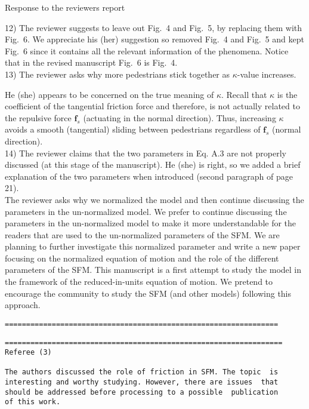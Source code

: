 \documentclass[a4paper,12pt]{letter}
\begin{document}
\begin{letter}{Response to the reviewers report}
{12) The reviewer suggests to leave out Fig.~4 and Fig.~5, by replacing them with Fig.~6. 
We appreciate his (her) suggestion so removed Fig.~4 and Fig.~5 and kept Fig.~6 since it
contains all the relevant information of the phenomena. Notice that in the revised manuscript Fig.~6 is Fig.~4. \\

13) The reviewer asks why more pedestrians stick together as $\kappa$-value increases. 

He (she) appears to be concerned on the true meaning of $\kappa$. 
Recall that $\kappa$ is the coefficient of the tangential friction force and therefore,
is not actually related to the repulsive force $\mathbf{f}_s$ (actuating in the normal direction). 
Thus, increasing $\kappa$ avoids a smooth (tangential) sliding between pedestrians
regardless of $\mathbf{f}_s$ (normal direction). \\

14) The reviewer claims that the two parameters in Eq. A.3 are not properly discussed (at this stage of the manuscript).
He (she) is right, so we added a brief explanation of the two parameters when introduced (second paragraph of page 21).\\

The reviewer asks why we normalized the model and then continue discussing the parameters in the un-normalized model. We prefer to continue discussing the parameters in the un-normalized model to make it more understandable for the readers that are used to the un-normalized parameters of the SFM. We are planning to further investigate this normalized parameter and write a new paper focusing on the normalized equation of motion and the role of the different parameters of the SFM. This manuscript is a first attempt to study the model in the framework of the reduced-in-units equation of motion. We pretend to encourage the community to study the SFM (and other models) following this approach.


\begin{verbatim}
================================================================
\end{verbatim}

}

\newpage


\begin{verbatim}
=================================================================
Referee (3)

The authors discussed the role of friction in SFM. The topic  is 
interesting and worthy studying. However, there are issues  that 
should be addressed before processing to a possible  publication 
of this work.


\end{verbatim}
\end{letter}
\end{document}
